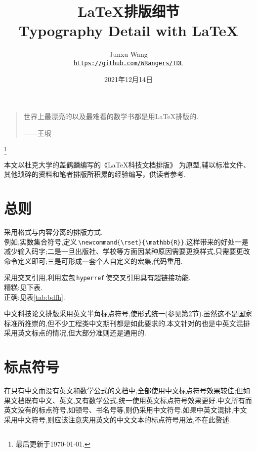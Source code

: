 \documentclass[a4paper]{article}
\title{{\fontspec{Palatino}\LaTeX{}}{\CJKfontspec{方正小标宋简体}排版细节}\\%
\fontspec{Palatino}Typography Detail with \LaTeX}
\author{{\small\fontspec{Zapfino}Junxu Wang}\\%
\href{https://github.com/WRangers/TDL}{\texttt{https://github.com/WRangers/TDL}}}
\date{2021年12月14日}
\newcommand{\sref}[1]{\CJKecglue\ref{#1}}
\newcommand{\dref}[1]{\CJKecglue\ref{#1}\CJKecglue}
\newcommand{\scite}[1]{\CJKecglue\cite{#1}}
\begin{document}
\maketitle

\begin{quote}
	世界上最漂亮的以及最难看的数学书都是用\LaTeX{}排版的.\eop

	\hfill ——王垠
\end{quote}
\renewcommand\thefootnote{}
\footnote{最后更新于\today\!.\eop}
\setcounter{footnote}{0}
\renewcommand\thefootnote{\arabic{footnote}}

本文以杜克大学的盖鹤麟编写的《\LaTeX{}科技文档排版》\cite{2} 为原型,辅以标准文件、其他琐碎的资料和笔者排版所积累的经验编写，供读者参考.\eop

\section{总则}
\begin{compactitem}[\hspace{1.02em}$\bullet$]
	\item 采用格式与内容分离的排版方式.\\
	例如,实数集合符号,定义\,\verb|\newcommand{\rset}{\mathbb{R}}|.这样带来的好处一是减少输入码字;二是一旦出版社、学校等方面因某种原因需要更换样式,只需要更改命令定义即可;三是可形成一套个人自定义的宏集,代码重用.
	\item 采用交叉引用,利用宏包\,\verb|hyperref|\,使交叉引用具有超链接功能.\\
	\textsf{糟糕}:见下表.\\
	\textsf{正确}:见表\sref{tab:bdfh}.
	\item 中文科技论文排版采用英文半角标点符号,使形式统一(参见第\dref{sec:bdfh}节).虽然这不是国家标准所推崇的,但不少工程类中文期刊都是如此要求的.本文针对的也是中英文混排采用英文标点的情况,但大部分准则还是通用的.\eop
\end{compactitem}

\section{标点符号}\label{sec:bdfh}
在只有中文而没有英文和数学公式的文档中,全部使用中文标点符号效果较佳;但如果文档既有中文、英文,又有数学公式,统一使用英文标点符号效果更好.中文所有而英文没有的标点符号,如顿号、书名号等,则仍采用中文符号.如果中英文混排,中文采用中文符号,则应该注意夹用英文的中文文本的标点符号用法\scite{4},不在此赘述.\eop
\end{document}
